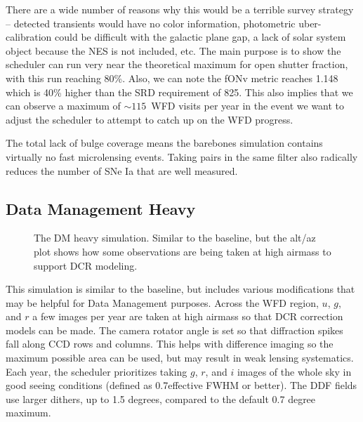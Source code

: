 There are a wide number of reasons why this would be a terrible survey strategy -- detected transients would have no color information, photometric uber-calibration could be difficult with the galactic plane gap, a lack of solar system object because the NES is not included, etc.  The main purpose is to show the scheduler can run very near the theoretical maximum for open shutter fraction, with this run reaching 80\%. Also, we can note the fONv metric reaches 1.148 which is 40\% higher than the SRD requirement of 825. This also implies that we can observe a maximum of $\sim115$\ WFD visits per year in the event we want to adjust the scheduler to attempt to catch up on the WFD progress. 

The total lack of bulge coverage means the barebones simulation contains virtually no fast microlensing events. Taking pairs in the same filter also radically reduces the number of SNe Ia that are well measured. 

\subsection{Data Management Heavy}\label{ss:1.6dmheavy}

\begin{figure}
\caption{The DM heavy simulation. Similar to the baseline, but the alt/az plot shows how some observations are being taken at high airmass to support DCR modeling.}\label{fig:dmheavy}
\end{figure}


This simulation is similar to the baseline, but includes various modifications that may be helpful for Data Management purposes. Across the WFD region, $u$, $g$, and $r$ a few images per year are taken at high airmass so that DCR correction models can be made. The camera rotator angle is set so that diffraction spikes fall along CCD rows and columns. This helps with difference imaging so the maximum possible area can be used, but may result in weak lensing systematics.  Each year, the scheduler prioritizes taking $g$, $r$, and $i$ images of the whole sky in good seeing conditions (defined as 0.7\arcsec effective FWHM or better).  The DDF fields use larger dithers, up to 1.5 degrees, compared to the default 0.7 degree maximum.

